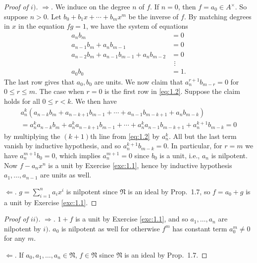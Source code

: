 \documentclass[12pt,letterpaper]{article}
\theoremstyle{definition}
\theoremstyle{remark}
\numberwithin{figure}{problem}
\numberwithin{equation}{section}
\begin{document}
\begin{proof}[Proof of
  $i)$]
  $\Rightarrow$.
  We induce on the degree
  $n$ of
  $f$.
  If
  $n=0$, then
  $f = a_0 \in
  A^\times$.
  So suppose
  $n >
  0$.
  Let
  $b_0 + b_1x + \cdots +
  b_mx^m$ be the inverse of
  $f$.
  By matching degrees in
  $x$ in the equation
  $fg =
  1$, we have the system of equations
  \begin{equation}\label{eq:1.2}
    \begin{aligned}
      a_nb_m &%
      = 0\\
      a_{n-1}b_m + a_nb_{m-1} &%
      = 0\\
      a_{n-2}b_m + a_{n-1}b_{m-1} + a_nb_{m-2} &%
      = 0\\
      &%
      \ \,\vdots\\
      a_0b_0 &%
      = 1.
    \end{aligned}
  \end{equation}
  The last row gives that
  $a_0,b_0$ are units.
  We now claim that
  $a_n^{r+1}b_{m-r} =
  0$ for
  $0 \le r \le
  m$.
  The case when
  $r=0$ is the first row in \eqref{eq:1.2}.
  Suppose the claim holds for all
  $0 \le r <
  k$.
  We then have
  \begin{multline*}
    a_n^k(a_{n-k}b_m + a_{n-k+1}b_{m-1} + \cdots + a_{n-1}b_{m-k+1} + a_nb_{m-k})\\
    = a_n^ka_{n-k}b_m + a_n^ka_{n-k+1}b_{m-1} + \cdots + a_n^ka_{n-1}b_{m-k+1} + a_n^{k+1}b_{m-k} = 0
  \end{multline*}
  by multiplying the
  $(k+1)$th line from \eqref{eq:1.2} by
  $a_n^k$.
  All but the last term vanish by inductive hypothesis, and so
  $a_n^{k+1}b_{m-k} =
  0$.
  In particular, for
  $r=m$ we have
  $a_n^{m+1}b_0 =
  0$, which implies
  $a_n^{m+1} =
  0$ since
  $b_0$ is a unit, i.e.,
  $a_n$ is nilpotent.
  Now
  $f -
  a_nx^n$ is a unit by Exercise \ref{exc:1.1}, hence by inductive hypothesis
  $a_1,\ldots,a_{n-1}$ are units as well.
  \par
  $\Leftarrow$.
  $g = \sum_{i=1}^n
  a_ix^i$ is nilpotent since
  $\mathfrak{N}$ is an ideal by Prop.~1.7, so
  $f = a_0 +
  g$ is a unit by Exercise \ref{exc:1.1}.
\end{proof}
\begin{proof}[Proof of
  $ii)$]
  $\Rightarrow$.
  $1 +
  f$ is a unit by Exercise \ref{exc:1.1}, and so
  $a_1,\ldots,a_n$ are nilpotent by
  $i)$.
  $a_0$ is nilpotent as well for otherwise
  $f^m$ has constant term
  $a_0^m \ne
  0$ for any
  $m$.
  \par
  $\Leftarrow$.
  If
  $a_0,a_1,\ldots,a_n \in
  \mathfrak{N}$,
  $f \in
  \mathfrak{N}$ since
  $\mathfrak{N}$ is an ideal by Prop.~1.7.
\end{proof}
\end{document}
